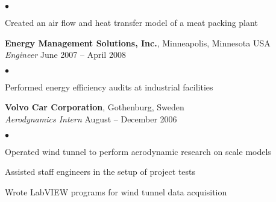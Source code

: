\documentclass[margin,line,10pt]{res}
\newenvironment{list2}{
  \begin{list}{$\bullet$}{%
      \setlength{\itemsep}{0in}
      \setlength{\parsep}{0in} \setlength{\parskip}{0in}
      \setlength{\topsep}{0in} \setlength{\partopsep}{0in}
      \setlength{\leftmargin}{0.2in}}}{\end{list}}
\begin{document}
\begin{resume}
\begin{list2}
\item Created an air flow and heat transfer model of a meat packing plant
\end{list2}

\vspace*{-.1in}

{\bf Energy Management Solutions, Inc.}, Minneapolis, Minnesota USA\\
\vspace{-.3cm}
{\em Engineer} \hfill June 2007 -- April 2008\\
\begin{list2}
\item Performed energy efficiency audits at industrial facilities
\end{list2}

\vspace*{-.1in}

{\bf Volvo Car Corporation}, Gothenburg, Sweden\\
\vspace{-.3cm}
{\em Aerodynamics Intern} \hfill August -- December 2006\\
\begin{list2}
\item Operated wind tunnel to perform aerodynamic research on scale models
\item Assisted staff engineers in the setup of project tests
\item Wrote LabVIEW programs for wind tunnel data acquisition
\end{list2}

\vspace*{-.1in}


\end{resume}
\end{document}
